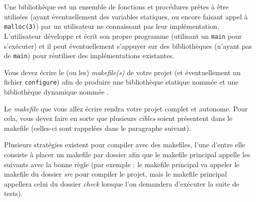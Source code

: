

\vspace*{0.7cm}

\noindent {}

\bigskip

\noindent Une bibliothèque est un ensemble de fonctions et procédures prêtes à être utilisées (ayant éventuellement des variables statiques, ou encore faisant appel à \texttt{malloc(3)}) par un utilisateur ne connaissant pas leur implémentation.
L'utilisateur développe et écrit son propre programme (utilisant un \texttt{main} pour s'exécuter) et il peut éventuellement s'appuyer sur des bibliothèques (n'ayant pas de \texttt{main}) pour réutiliser des implémentations existantes.

\bigskip

Vous devez écrire le (ou les) \textit{makefile(s)} de votre projet (et éventuellement un fichier \texttt{configure}) afin de produire une bibliothèque statique nommée  et une bibliothèque dynamique nommée .

\bigskip

\noindent Le \textit{makefile} que vous allez écrire rendra votre projet complet et autonome.
Pour cela, vous devez faire en sorte que plusieurs \textit{cibles} soient présentent dans le makefile (celles-ci sont rappelées dans le paragraphe suivant).

\bigskip

\noindent Plusieurs stratégies existent pour compiler avec des makefiles, l'une d'entre elle consiste à placer un makefile par dossier afin que le makefile principal appelle les suivants avec la bonne règle (par exemple : le makefile principal va appeler le makefile du dossier \textit{src} pour compiler le projet, mais le makefile principal appellera celui du dossier \textit{check} lorsque l'on demandera d'exécuter la suite de tests).

